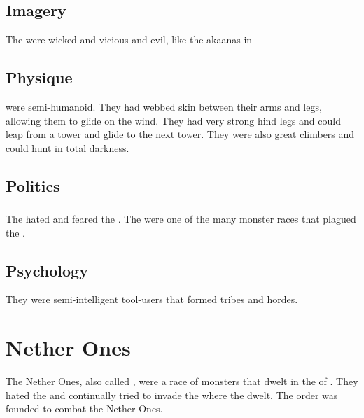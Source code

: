 \subsection{Imagery}
The \morkins were wicked and vicious and evil, like the akaanas in 









\subsection{Physique}
\Morkins were semi-humanoid.
They had webbed skin between their arms and legs, allowing them to glide on the wind.
They had very strong hind legs and could leap from a tower and glide to the next tower. 
They were also great climbers and could hunt in total darkness.









\subsection{Politics}





\subsubsection{\Resphain}
The \resphain hated and feared the \morkins.
The \morkins were one of the many monster races that plagued the \resphain. 









\subsection{Psychology}
They were semi-intelligent tool-users that formed tribes and hordes. 















\section{Nether Ones}
The Nether Ones, also called \mothlain, were a race of monsters that dwelt in the  of \Nyx. 
They hated the \resphain and continually tried to invade the  where the \resphain dwelt. 
The  order was founded to combat the Nether Ones. 








